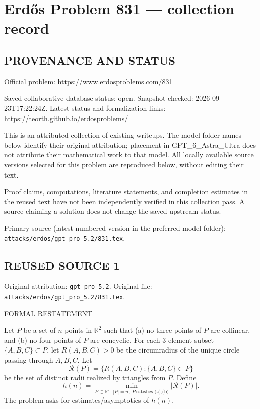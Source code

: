 \section*{Erd\H{o}s Problem 831 --- collection record}

\subsection*{PROVENANCE AND STATUS}
Official problem: https://www.erdosproblems.com/831

Saved collaborative-database status: open.
Snapshot checked: 2026-09-23T17:22:24Z.
Latest status and formalization links: https://teorth.github.io/erdosproblems/

This is an attributed collection of existing writeups. The model-folder names below identify their original attribution; placement in GPT\_6\_Astra\_Ultra does not attribute their mathematical work to that model. All locally available source versions selected for this problem are reproduced below, without editing their text.

Proof claims, computations, literature statements, and completion estimates in the reused text have not been independently verified in this collection pass. A source claiming a solution does not change the saved upstream status.

Primary source (latest numbered version in the preferred model folder): \texttt{attacks/erdos/gpt\_pro\_5.2/831.tex}.

\subsection*{REUSED SOURCE 1}
Original attribution: \texttt{gpt\_pro\_5.2}.
Original file: \texttt{attacks/erdos/gpt\_pro\_5.2/831.tex}.


FORMAL RESTATEMENT

Let $P$ be a set of $n$ points in $\mathbb{R}^2$ such that
(a) no three points of $P$ are collinear, and
(b) no four points of $P$ are concyclic.
For each 3-element subset $\{A,B,C\}\subset P$, let $R(A,B,C)>0$ be the circumradius of the unique circle passing through $A,B,C$.
Let
\[
\mathcal{R}(P)=\{R(A,B,C): \{A,B,C\}\subset P\}
\]
be the set of distinct radii realized by triangles from $P$.
Define
\[
 h(n)=\min_{P\subset\mathbb{R}^2:\ |P|=n,\ P\ \text{satisfies (a),(b)}} |\mathcal{R}(P)|.
\]
The problem asks for estimates/asymptotics of $h(n)$.

